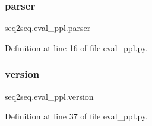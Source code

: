 \subsubsection{\texorpdfstring{parser}{parser}}
{\footnotesize\ttfamily seq2seq.\+eval\+\_\+ppl.\+parser}



Definition at line 16 of file eval\+\_\+ppl.\+py.

\mbox{\label{namespaceseq2seq_1_1eval__ppl_a5ce98aa272398ba396f59de6da776cbe}} 
\subsubsection{\texorpdfstring{version}{version}}
{\footnotesize\ttfamily seq2seq.\+eval\+\_\+ppl.\+version}



Definition at line 37 of file eval\+\_\+ppl.\+py.

